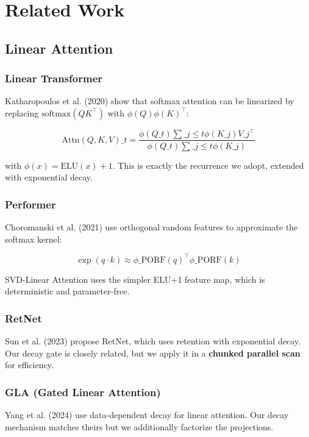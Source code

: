 
\section{Related Work}

\subsection{Linear Attention}

\subsubsection{Linear Transformer}

Katharopoulos et al. (2020) show that softmax attention can be linearized 
by replacing $\text{softmax}(Q K^\top)$ with $\phi(Q) \phi(K)^\top$:

\[
\text{Attn}(Q, K, V)\_t = \frac{\phi(Q\_t) \sum\_{j \leq t} \phi(K\_j) V\_j^\top}{\phi(Q\_t) \sum\_{j \leq t} \phi(K\_j)}
\tag{2.1}
\]

with $\phi(x) = \text{ELU}(x) + 1$. This is exactly the recurrence we adopt, 
extended with exponential decay.

\subsubsection{Performer}

Choromanski et al. (2021) use orthogonal random features to approximate 
the softmax kernel:

\[
\exp(q \cdot k) \approx \phi\_{\text{PORF}}(q)^\top \phi\_{\text{PORF}}(k)
\tag{2.2}
\]

SVD-Linear Attention uses the simpler ELU+1 feature map, which is 
deterministic and parameter-free.

\subsubsection{RetNet}

Sun et al. (2023) propose RetNet, which uses retention with exponential 
decay. Our decay gate is closely related, but we apply it in a 
\textbf{chunked parallel scan} for efficiency.

\subsubsection{GLA (Gated Linear Attention)}

Yang et al. (2024) use data-dependent decay for linear attention. Our 
decay mechanism matches theirs but we additionally factorize the projections.

